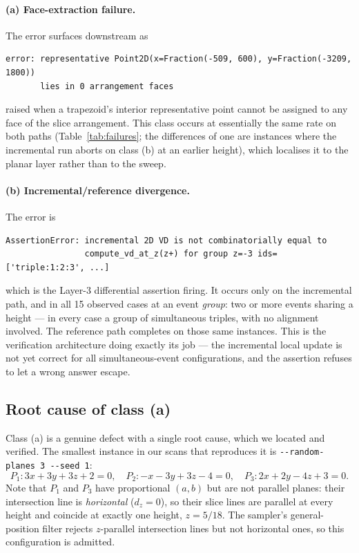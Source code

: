 \documentclass[11pt]{article}
\begin{document}
\paragraph{(a) Face-extraction failure.}
The error surfaces downstream as
\begin{lstlisting}
error: representative Point2D(x=Fraction(-509, 600), y=Fraction(-3209, 1800))
       lies in 0 arrangement faces
\end{lstlisting}
raised when a trapezoid's interior representative point cannot be assigned to
any face of the slice arrangement.  This class occurs at essentially the same
rate on both paths (Table~\ref{tab:failures}; the differences of one are
instances where the incremental run aborts on class (b) at an earlier height),
which localises it to the planar layer rather than to the sweep.

\paragraph{(b) Incremental/reference divergence.}
The error is
\begin{lstlisting}
AssertionError: incremental 2D VD is not combinatorially equal to
                compute_vd_at_z(z+) for group z=-3 ids=['triple:1:2:3', ...]
\end{lstlisting}
which is the Layer-3 differential assertion firing.  It occurs only on the
incremental path, and in all 15 observed cases at an event \emph{group}: two or
more events sharing a height --- in every case a group of simultaneous triples,
with no alignment involved.  The reference path completes on those same
instances.
This is the verification architecture doing exactly its job --- the incremental
local update is not yet correct for all simultaneous-event configurations, and
the assertion refuses to let a wrong answer escape.

\subsection{Root cause of class (a)}

Class (a) is a genuine defect with a single root cause, which we located and
verified.  The smallest instance in our scans that reproduces it is
\verb|--random-planes 3 --seed 1|:
\[
  P_1: 3x + 3y + 3z + 2 = 0,\quad
  P_2: -x - 3y + 3z - 4 = 0,\quad
  P_3: 2x + 2y - 4z + 3 = 0 .
\]
Note that $P_1$ and $P_3$ have proportional $(a,b)$ but are not parallel
planes: their intersection line is \emph{horizontal} ($d_z = 0$), so their slice
lines are parallel at every height and coincide at exactly one height,
$z = 5/18$.  The sampler's general-position filter rejects $z$-parallel
intersection lines but not horizontal ones, so this configuration is admitted.
\end{document}
